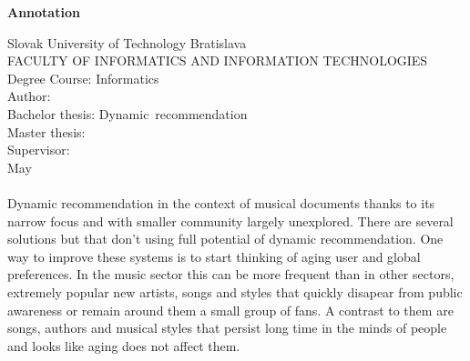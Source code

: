 \thispagestyle{plain}
\begin{center}
\begin{Large}
\textbf{Annotation} \\
\end{Large}
\end{center}
Slovak University of Technology Bratislava \\
FACULTY OF INFORMATICS AND INFORMATION TECHNOLOGIES \\
\noindent
Degree Course: Informatics \\
\noindent
Author: \Author \\
{
    {Bachelor thesis: }\mbox{Dynamic recommendation}\\
}
{
    {Master thesis: }\Title \\
}
Supervisor: \Supervisor \\
May \Year \\
\noindent
\\
Dynamic recommendation in the context of musical documents thanks to its narrow focus and with smaller community largely unexplored. There are several solutions but that don't using full potential of dynamic recommendation. One way to improve these systems is to start thinking of aging user and global preferences. In the music sector this can be more frequent than in other sectors, extremely popular new artists, songs and styles that quickly disapear from public awareness or remain around them a small group of fans. A contrast to them are songs, authors and musical styles that persist long time in the minds of people and looks like aging does not affect them.
